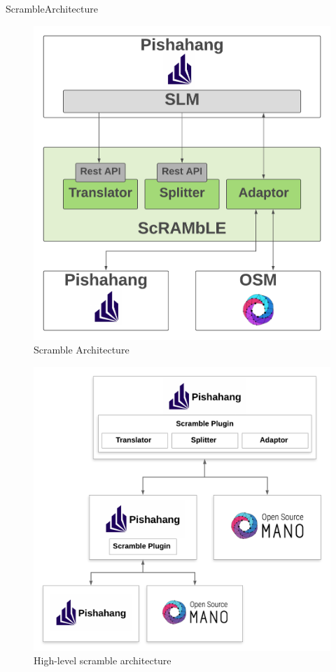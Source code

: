 ScrambleArchitecture
\begin{figure}[h]
	\centering
	\includegraphics[width=0.9\linewidth]{../figures/ScrambleArchitecture}
	\caption{Scramble Architecture}
	\label{fig:scramble-architecture}
\end{figure}

\begin{figure}[h]
	\centering
	\includegraphics[width=0.9\linewidth]{../figures/ScrambleArch}
	\caption{High-level scramble architecture}
	\label{fig:scramble-arch}
\end{figure}

